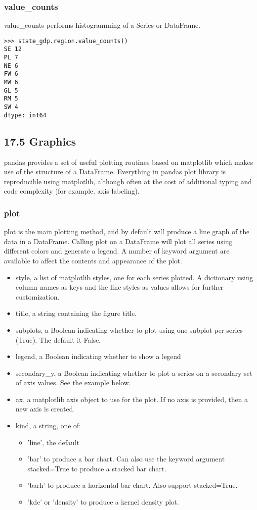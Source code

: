 \documentclass[KSmain.tex]{subfiles}
\begin{document}
\subsubsection*{value\_counts}
value\_counts performs histogramming of a Series or DataFrame.

\begin{framed}
\begin{verbatim}
>>> state_gdp.region.value_counts()
SE 12
PL 7
NE 6
FW 6
MW 6
GL 5
RM 5
SW 4
dtype: int64
\end{verbatim}
\end{framed}

\subsection{17.5 Graphics}
pandas provides a set of useful plotting routines based on matplotlib which makes use of the structure
of a DataFrame. Everything in pandas plot library is reproducible using matplotlib, although often at the
cost of additional typing and code complexity (for example, axis labeling).

\subsubsection*{plot}
plot is the main plotting method, and by default will produce a line graph of the data in a DataFrame.
Calling plot on a DataFrame will plot all series using different colors and generate a legend. A number of
keyword argument are available to affect the contents and appearance of the plot.
\begin{itemize}
\item style, a list of matplotlib styles, one for each series plotted. A dictionary using column names as
keys and the line styles as values allows for further customization.
\item title, a string containing the figure title.
\item subplots, a Boolean indicating whether to plot using one subplot per series (True). The default it
False.
\item legend, a Boolean indicating whether to show a legend
\item secondary\_y, a Boolean indicating whether to plot a series on a secondary set of axis values. See the
example below.
\item ax, a matplotlib axis object to use for the plot. If no axis is provided, then a new axis is created.
\item kind, a string, one of:
\begin{itemize}
\item ’line’, the default
\item ’bar’ to produce a bar chart. Can also use the keyword argument stacked=True to produce a
stacked bar chart.
\item ’barh’ to produce a horizontal bar chart. Also support stacked=True.
\item’kde’ or ’density’ to produce a kernel density plot.
\end{itemize}
\end{itemize}
\end{document}
